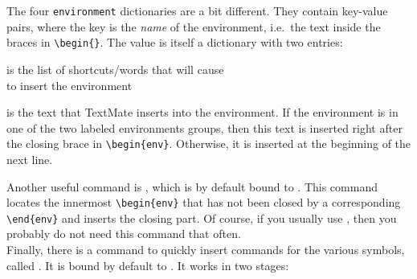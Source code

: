 \documentclass[11pt, x11names]{article}
\begin{document}
The four \texttt{environment} dictionaries are a bit different. They contain key-value pairs, where the key is the \emph{name} of the environment, i.e.~the text inside the braces in \texttt{\textbackslash{}begin\{\}}. The value is itself a dictionary with two entries:

\begin{description}[style=multiline, leftmargin=1.8cm]

  \item[\texttt{triggers}] is the list of shortcuts/words that will cause\\  to insert the environment

  \item[\texttt{content}] is the text that TextMate inserts into the environment. If the environment is in one of the two labeled environments groups, then this text is inserted right after the closing brace in \texttt{\textbackslash{}begin\{env\}}. Otherwise, it is inserted at the beginning of the next line.

\end{description}

Another useful command is , which is by default bound to . This command locates the innermost \texttt{\textbackslash{}begin\{env\}} that has not been closed by a corresponding \texttt{\textbackslash{}end\{env\}} and inserts the closing part. Of course, if you usually use , then you probably do not need this command that often.\\

Finally, there is a command to quickly insert commands for the various symbols, called . It is bound by default to \keys{\cmd + \textbackslash{}}. It works in two stages:
\end{document}
